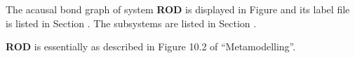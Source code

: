 
%

   The acausal bond graph of system \textbf{ROD} is
   displayed in Figure  and its label
   file is listed in Section .
   The subsystems are listed in Section .

{\bf ROD} is essentially as described in Figure 10.2 of
``Metamodelling''.
